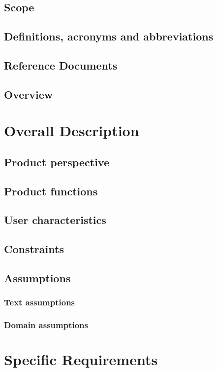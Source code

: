 \documentclass[11pt,a4paper]{report}
\begin{document}
\section{Scope}
\section{Definitions, acronyms and abbreviations}
\section{Reference Documents}
\section{Overview}
\chapter{Overall Description}
\section{Product perspective}
\section{Product functions}
\section{User characteristics}
\section{Constraints}
\section{Assumptions}
\subsection{Text assumptions}
\subsection{Domain assumptions}
\chapter{Specific Requirements}
\end{document}
